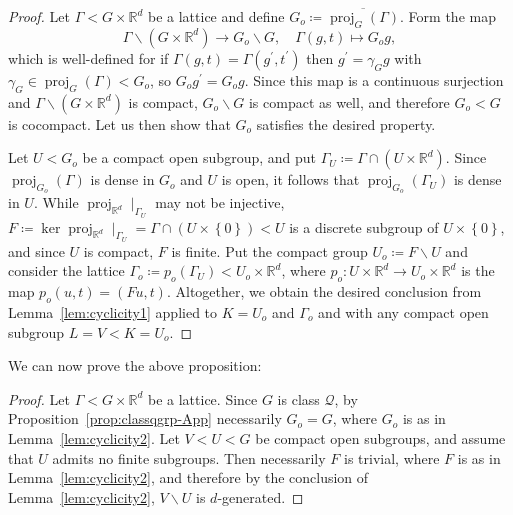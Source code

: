 \documentclass{amsart}
\numberwithin{equation}{subsection}
\theoremstyle{remark}
\begin{document}
\begin{proof}
Let \(\Gamma<G\times\mathbb{R}^{d}\) be a lattice and define \(G_{o}\coloneqq\overline{\operatorname{proj}_{G}\left(\Gamma\right)}\). Form the map
\[\Gamma\backslash\left(G\times\mathbb{R}^{d}\right)\to G_{o}\backslash G,\quad\Gamma\left(g,t\right)\mapsto G_{o}g,\]
which is well-defined for if \(\Gamma\left(g,t\right)=\Gamma\left(g^{\prime},t^{\prime}\right)\) then \(g^{\prime}=\gamma_{G}g\) with \(\gamma_{G}\in\operatorname{proj}_{G}\left(\Gamma\right)<G_{o}\), so \(G_{o}g^{\prime}=G_{o}g\). Since this map is a continuous surjection and \(\Gamma\backslash\left(G\times\mathbb{R}^{d}\right)\) is compact, \(G_{o}\backslash G\) is compact as well, and therefore \(G_{o}<G\) is cocompact. Let us then show that \(G_{o}\) satisfies the desired property.

Let \(U<G_{o}\) be a compact open subgroup, and put \(\Gamma_{U}\coloneqq\Gamma\cap\left(U\times\mathbb{R}^{d}\right)\). Since \(\operatorname{proj}_{G_{o}}\left(\Gamma\right)\) is dense in \(G_{o}\) and \(U\) is open, it follows that \(\operatorname{proj}_{G_{o}}\left(\Gamma_{U}\right)\) is dense in \(U\). While \(\operatorname{proj}_{\mathbb{R}^{d}}\mid_{\Gamma_{U}}\) may not be injective, \(F\coloneqq\ker\operatorname{proj}_{\mathbb{R}^{d}}\mid_{\Gamma_{U}}=\Gamma\cap\left(U\times\left\{0\right\} \right)<U\) is a discrete subgroup of \(U\times\left\{ 0\right\}\), and since \(U\) is compact, \(F\) is finite. Put the compact group \(U_{o}\coloneqq F\backslash U\) and consider the lattice \(\Gamma_{o}\coloneqq p_{o}\left(\Gamma_{U}\right)<U_{o}\times\mathbb{R}^{d}\), where \(p_{o}:U\times\mathbb{R}^{d}\to U_{o}\times\mathbb{R}^{d}\) is the map \(p_{o}\left(u,t\right)=\left(Fu,t\right)\). Altogether, we obtain the desired conclusion from Lemma~\ref{lem:cyclicity1} applied to \(K=U_{o}\) and \(\Gamma_{o}\) and with any compact open subgroup \(L=V<K=U_{o}\).
\end{proof}

We can now prove the above proposition:

\begin{proof}
Let \(\Gamma<G\times\mathbb{R}^{d}\) be a lattice. Since \(G\) is class \(\mathcal{Q}\), by Proposition~\ref{prop:classqgrp-App} necessarily \(G_{o}=G\), where \(G_{o}\) is as in Lemma~\ref{lem:cyclicity2}. Let \(V<U<G\) be compact open subgroups, and assume that \(U\) admits no finite subgroups. Then necessarily \(F\) is trivial, where \(F\) is as in Lemma~\ref{lem:cyclicity2}, and therefore by the conclusion of Lemma~\ref{lem:cyclicity2}, \(V\backslash U\) is \(d\)-generated.
\end{proof}
\end{document}
